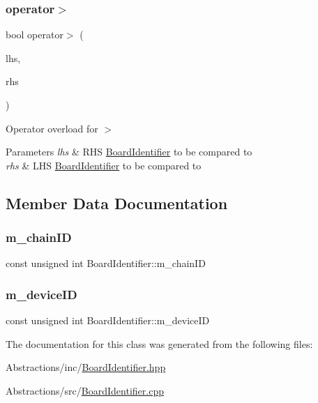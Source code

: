 \subsubsection{\texorpdfstring{operator$>$}{operator>}}
{\footnotesize\ttfamily bool operator$>$ (\begin{DoxyParamCaption}\item[{const \hyperlink{class_board_identifier}{Board\+Identifier} \&}]{lhs,  }\item[{const \hyperlink{class_board_identifier}{Board\+Identifier} \&}]{rhs }\end{DoxyParamCaption})\hspace{0.3cm}{\ttfamily [friend]}}



Operator overload for $>$ 


\begin{DoxyParams}{Parameters}
{\em lhs} & R\+HS \hyperlink{class_board_identifier}{Board\+Identifier} to be compared to \\
\hline
{\em rhs} & L\+HS \hyperlink{class_board_identifier}{Board\+Identifier} to be compared to \\
\hline
\end{DoxyParams}


\subsection{Member Data Documentation}
\mbox{\label{class_board_identifier_a53a9a7c31a0316eed7932615b04293ff}} 
\subsubsection{\texorpdfstring{m\+\_\+chain\+ID}{m\_chainID}}
{\footnotesize\ttfamily const unsigned int Board\+Identifier\+::m\+\_\+chain\+ID\hspace{0.3cm}{\ttfamily [protected]}}

\mbox{\label{class_board_identifier_ad7798603dc56380e884d075ba81495e1}} 
\subsubsection{\texorpdfstring{m\+\_\+device\+ID}{m\_deviceID}}
{\footnotesize\ttfamily const unsigned int Board\+Identifier\+::m\+\_\+device\+ID\hspace{0.3cm}{\ttfamily [protected]}}



The documentation for this class was generated from the following files\+:\begin{DoxyCompactItemize}
\item 
Abstractions/inc/\hyperlink{_board_identifier_8hpp}{Board\+Identifier.\+hpp}\item 
Abstractions/src/\hyperlink{_board_identifier_8cpp}{Board\+Identifier.\+cpp}\end{DoxyCompactItemize}
